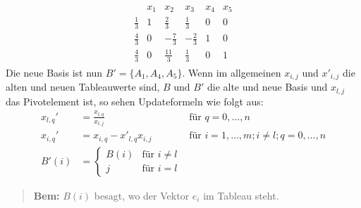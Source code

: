\begin{example}
\begin{align*}
\begin{matrix}
 & x_1 & x_2 & x_3 & x_4 & x_5 \\
\frac{1}{3} & 1 & \frac{2}{3} & \frac{1}{3} & 0 & 0\\
\frac{4}{3} & 0 & -\frac{7}{3} & -\frac{2}{3} & 1 & 0\\
\frac{4}{3} & 0 & \frac{11}{3} & \frac{1}{3} & 0 & 1
\end{matrix}
\end{align*}
Die neue Basis ist nun $B' = \{ A_1, A_4, A_5 \}$. Wenn im allgemeinen $x_{i,j}$ und $x'_{i,j}$ die alten und neuen Tableauwerte sind, $B$ und $B'$ die alte und neue Basis und $x_{l,j}$ das Pivotelement ist, so sehen Updateformeln wie folgt aus:
\begin{align*}
x_{l,q}' &= \frac{x_{l,q}}{x_{l,j}} &\text{für } q=0,\dotsc,n \\
x_{i,q}' &= x_{i,q} - x'_{l,q} x_{i,j} &\text{für } i=1,\dotsc,m; i \neq l ; q = 0,\dotsc,n \\
B'(i) &= \begin{cases}
B(i) & \text{für } i \neq l \\
j & \text{für } i = l
\end{cases}
\end{align*}
\begin{quotation}
\textbf{Bem:} $B(i)$ besagt, wo der Vektor $e_i$ im Tableau steht.
\end{quotation}
\end{example}

